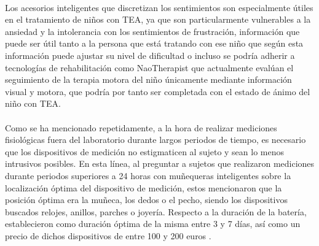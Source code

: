 \paragraph{}
Los acesorios inteligentes que discretizan los sentimientos son especialmente útiles en el tratamiento de niños con TEA, ya que son particularmente vulnerables a la ansiedad y la intolerancia con los sentimientos de frustración, información que puede ser útil tanto a la persona que está tratando con ese niño que según esta información puede ajustar su nivel de dificultad \citep{ernsperger2002keys} o incluso se podría adherir a tecnologías de rehabilitación como NaoTherapist \citep{pulido2017evaluating} que actualmente evalúan el seguimiento de la terapia motora del niño únicamente mediante información visual y motora, que podría por tanto ser completada con el estado de ánimo del niño con TEA.

\paragraph{}
Como se ha mencionado repetidamente, a la hora de realizar mediciones fisiológicas fuera del laboratorio durante largos periodos de tiempo, es necesario que los dispositivos de medición no estigmaticen al sujeto y sean lo menos intrusivos posibles. En esta línea, al preguntar a sujetos que realizaron mediciones durante periodos superiores a 24 horas con muñequeras inteligentes sobre la localización óptima del dispositivo de medición, estos mencionaron que la posición óptima era la muñeca, los dedos o el pecho, siendo los dispositivos buscados relojes, anillos, parches o joyería. Respecto a la duración de la batería, establecieron como duración óptima de la misma entre 3 y 7 días, así como un precio de dichos dispositivos de entre 100 y 200 euros \citep{koskimaki2017early}.

